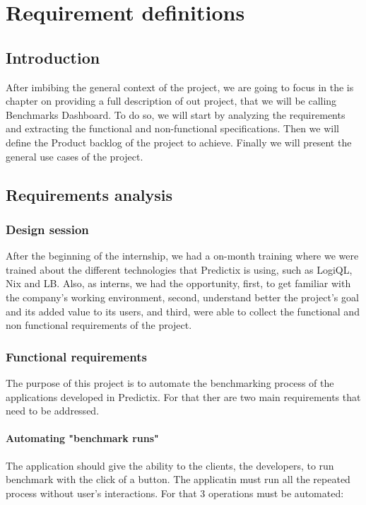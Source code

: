\chapter{Requirement definitions}

\section*{Introduction}

After imbibing the general context of the project, we are going to focus in
the is chapter on providing a full description of out project, that we will be
calling Benchmarks Dashboard. To do so, we will start by analyzing the
requirements and extracting the  functional and non-functional specifications.
Then we will define the Product backlog of the project to achieve. Finally we
will present the general use cases of the project.

\section{Requirements analysis}

\subsection{Design session}
After  the beginning of the internship, we had a on-month training where we were
trained about the different technologies that Predictix is using, such as
LogiQL, Nix and LB. Also, as interns, we had the opportunity, first, to get
familiar with the company's working environment, second, understand better the
project's goal and its added value to its users, and third, were able to collect
the functional and non functional requirements of the project.


\subsection{Functional requirements}
The  purpose of this project is to automate the benchmarking process of the
applications developed in Predictix. For that ther are two main requirements
that need to be addressed.

\subsubsection{Automating "benchmark runs"}
The application should give the ability to the clients, the developers, to run
benchmark with the click of a button. The applicatin must run all the repeated
process without user's interactions. For that 3 operations must be automated:

